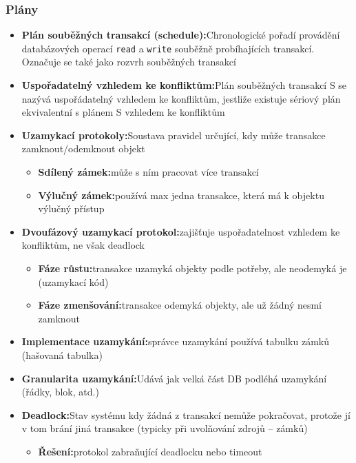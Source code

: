 \documentclass[a4paper,10pt]{article}
\newcommand{\pojem}[2]{\item \textbf{#1:}\quad #2}
\begin{document}
			\subsubsection{Plány}
				\begin{itemize}
					\pojem{Plán souběžných transakcí (schedule)}{Chronologické pořadí provádění databázových operací \texttt{read} a \texttt{write} souběžně probíhajících transakcí. Označuje se také jako rozvrh souběžných transakcí}

					\pojem{Uspořadatelný vzhledem ke konfliktům}{Plán souběžných transakcí S se nazývá uspořádatelný vzhledem ke konfliktům, jestliže existuje sériový plán ekvivalentní s plánem S vzhledem ke konfliktům}

					\pojem{Uzamykací protokoly}{Soustava pravidel určující, kdy může transakce zamknout/odemknout objekt}
					\begin{itemize}
						\pojem{Sdílený zámek}{může s ním pracovat více transakcí}
						\pojem{Výlučný zámek}{používá max jedna transakce, která má k objektu výlučný přístup}
					\end{itemize}

					\pojem{Dvoufázový uzamykací protokol}{zajišťuje uspořadatelnost vzhledem ke konfliktům, ne však deadlock}
					\begin{itemize}
						\pojem{Fáze růstu}{transakce uzamyká objekty podle potřeby, ale neodemyká je (uzamykací kód)}
						\pojem{Fáze zmenšování}{transakce odemyká objekty, ale už žádný nesmí zamknout}
					\end{itemize}

					\pojem{Implementace uzamykání}{správce uzamykání používá tabulku zámků (hašovaná tabulka)}

					\pojem{Granularita uzamykání}{Udává jak velká část DB podléhá uzamykání (řádky, blok, atd.)}

					\pojem{Deadlock}{Stav systému kdy žádná z transakcí nemůže pokračovat, protože jí v tom brání jiná transakce (typicky při uvolňování zdrojů -- zámků)}
					\begin{itemize}
						\pojem{Řešení}{protokol zabraňující deadlocku nebo timeout}
					\end{itemize}
				\end{itemize}
\end{document}
